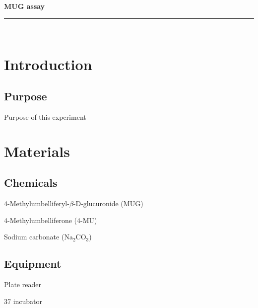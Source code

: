 \documentclass[a4paper,12pt]{article}
\newcommand{\protocol}{MUG assay}
\newcommand{\labtitle}{LAB TITLE}
\newcommand{\authorname}{YOURNAME}
\newenvironment{packed_enum}{
\begin{enumerate}
  \setlength{\itemsep}{1pt}
  \setlength{\parskip}{0pt}
  \setlength{\parsep}{0pt}
}{\end{enumerate}}
\begin{document}
 
 
 
\begin{titlepage}
\begin{center}
{\LARGE \textbf{\protocol} \\ \vspace{4pt}}
\rule[13pt]{\textwidth}{1pt} \\ \vspace{150pt}
\end{center}
 
\end{titlepage}
 
\newpage
\thispagestyle{empty}           %
\tableofcontents
\clearpage                      %
 
\setcounter{page}{1}
 
\section{Introduction}
	\subsection{Purpose}
		Purpose of this experiment
\section{Materials}
	\subsection{Chemicals}
	\begin{packed_enum}
	\item 4-Methylumbelliferyl-{$\beta$}-D-glucuronide (MUG)
	\item 4-Methylumbelliferone (4-MU)
	\item Sodium carbonate (Na$_{2}$CO$_{3}$)
	\end{packed_enum}
		
	\subsection{Equipment}
	\begin{packed_enum}
	\item Plate reader
	\item 37{\textcelsius} incubator
	\end{packed_enum}
 
\end{document}

